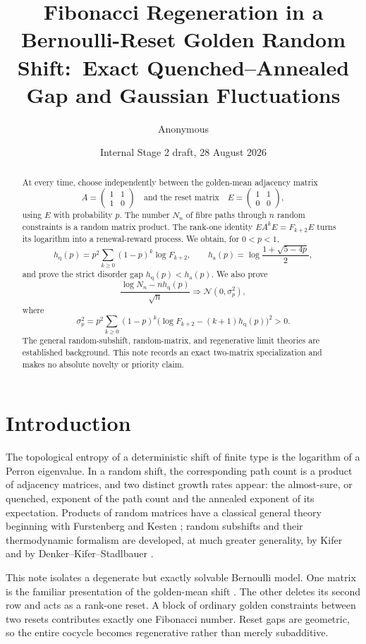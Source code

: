 \documentclass[11pt,a4paper]{amsart}
\title[Bernoulli-reset golden random shifts]{Fibonacci Regeneration in a Bernoulli-Reset Golden Random Shift:\
Exact Quenched--Annealed Gap and Gaussian Fluctuations}
\author{Anonymous}
\date{Internal Stage 2 draft, 28 August 2026}
\theoremstyle{definition}
\theoremstyle{remark}
\newcommand{\hq}{h_{\mathrm q}}
\newcommand{\ha}{h_{\mathrm a}}
\begin{document}
\begin{abstract}
At every time, choose independently between the golden-mean adjacency
matrix
\[
 A=\begin{pmatrix}1&1\\1&0\end{pmatrix}
 \quad\text{and the reset matrix}\quad
 E=\begin{pmatrix}1&1\\0&0\end{pmatrix},
\]
using $E$ with probability $p$.  The number $N_n$ of fibre paths through
$n$ random constraints is a random matrix product.  The rank-one identity
$EA^kE=F_{k+2}E$ turns its logarithm into a renewal-reward process.  We
obtain, for $0<p<1$,
\[
 \hq(p)=p^2\sum_{k\geq0}(1-p)^k\log F_{k+2},
 \qquad
 \ha(p)=\log\frac{1+\sqrt{5-4p}}2,
\]
and prove the strict disorder gap $\hq(p)<\ha(p)$.  We also prove
\[
 \frac{\log N_n-n\hq(p)}{\sqrt n}
 \Longrightarrow \mathcal N(0,\sigma_p^2),
\]
where
\[
 \sigma_p^2=p^2\sum_{k\geq0}(1-p)^k
 \bigl(\log F_{k+2}-(k+1)\hq(p)\bigr)^2>0.
\]
The general random-subshift, random-matrix, and regenerative limit theories
are established background.  This note records an exact two-matrix
specialization and makes no absolute novelty or priority claim.
\end{abstract}

\maketitle

\section{Introduction}

The topological entropy of a deterministic shift of finite type is the
logarithm of a Perron eigenvalue.  In a random shift, the corresponding path
count is a product of adjacency matrices, and two distinct growth rates
appear: the almost-sure, or quenched, exponent of the path count and the
annealed exponent of its expectation.  Products of random matrices have a
classical general theory beginning with Furstenberg and Kesten
\cite{FurstenbergKesten1960}; random subshifts and their thermodynamic
formalism are developed, at much greater generality, by Kifer and by
Denker--Kifer--Stadlbauer \cite{Kifer2008,DenkerKiferStadlbauer2008}.

This note isolates a degenerate but exactly solvable Bernoulli model.  One
matrix is the familiar presentation of the golden-mean shift
\cite{LindMarcus1995}.  The other deletes its second row and acts as a
rank-one reset.  A block of ordinary golden constraints between two resets
contributes exactly one Fibonacci number.  Reset gaps are geometric, so the
entire cocycle becomes regenerative rather than merely subadditive.
\end{document}
